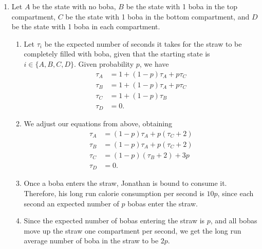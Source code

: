 \begin{enumerate}
    \item Let $A$ be the state with no boba, $B$ be the state with 1 boba in the top compartment, $C$ be the state with 1 boba in the bottom compartment, and $D$ be the state with 1 boba in each compartment.
    
    \begin{enumerate}
        \item Let $\tau_i$ be the expected number of seconds it takes for the straw to be completely filled with boba, given that the starting state is $i \in \{A, B, C, D\}$. Given probability $p$, we have
        \begin{align*}
            \tau_A &= 1 + (1 - p)\tau_A + p\tau_C\\
            \tau_B &= 1 + (1 - p)\tau_A + p\tau_C \\
            \tau_C &= 1 + (1 - p)\tau_B \\
            \tau_D &= 0.
        \end{align*}

        \item We adjust our equations from above, obtaining
        \begin{align*}
            \tau_A &= (1 - p)\tau_A + p(\tau_C + 2) \\
            \tau_B &= (1 - p)\tau_A + p(\tau_C + 2) \\
            \tau_C &= (1 - p)(\tau_B + 2) + 3p \\
            \tau_D &= 0.
        \end{align*}
        
        \item Once a boba enters the straw, Jonathan is bound to consume it. Therefore, his long run calorie consumption per second is $10p$, since each second an expected number of $p$ bobas enter the straw.
        
        \item Since the expected number of bobas entering the straw is $p$, and all bobas move up the straw one compartment per second, we get the long run average number of boba in the straw to be $2p$.
    \end{enumerate}
\end{enumerate}